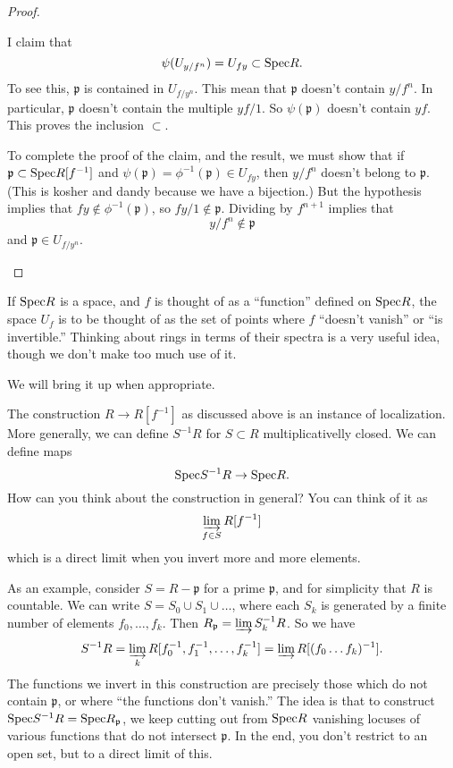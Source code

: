 \begin{proof}
\begin{enumerate}
I claim that
\[ \psi(U_{y/f^n}) = U_{fy} \subset \mathrm{Spec} R.  \]
To see this, $\mathfrak{p}$ is contained in $U_{f/y^n}$. This mean that
$\mathfrak{p}$ doesn't contain $y/f^n$.  In particular, $\mathfrak{p}$ doesn't
contain  the multiple $yf/1$.  So $\psi(\mathfrak{p})$ doesn't contain $yf$.
This proves the inclusion $\subset$.  

To complete the proof of the claim, and
the result, we must show that if $\mathfrak{p} \subset \mathrm{Spec} R[f^{-1}]$ and
$\psi(\mathfrak{p}) = \phi^{-1}(\mathfrak{p}) \in U_{fy}$, then $y/f^n$ doesn't
belong to $\mathfrak{p}$.  (This is kosher and dandy because we have a bijection.) But the hypothesis implies that $fy \notin
\phi^{-1}(\mathfrak{p})$, so $fy/1 \notin \mathfrak{p}$.  Dividing by $f^{n+1}$
implies that
\[ y/f^{n} \notin \mathfrak{p}  \]
and $\mathfrak{p} \in U_{f/y^n}$. 
\end{enumerate}
\end{proof} 

If $\mathrm{Spec} R$ is a space, and $f$ is thought of as a ``function'' defined on
$\mathrm{Spec} R$, the space $U_f$ is to be thought of as the set of points where $f$
``doesn't vanish'' or ``is invertible.''
Thinking about rings in terms of their spectra is a very useful idea, though we
don't make too much use of it. 

We will bring it up when appropriate.  

\begin{remark} 
The construction $R \to R[f^{-1}]$ as discussed above is an instance of
localization.  More generally, we can define $S^{-1}R$ for $S \subset R$
multiplicativelly closed. We can define maps
\[ \mathrm{Spec} S^{-1}R \to \mathrm{Spec} R . \]
How can you think about the construction in general? You can think of it as
\[ \varinjlim_{f \in S} R[f^{-1}]  \]
which is a direct limit when you invert more and more elements.  

As an example, consider $S = R - \mathfrak{p}$ for a prime $\mathfrak{p}$, and for
simplicity that $R$ is countable. We can write $S =
S_0 \cup S_1 \cup \dots$, where each $S_k$ is generated by a finite number of
elements $f_0, \dots, f_k$.  Then $R_{\mathfrak{p}} = \varinjlim S_k^{-1} R$.
So we have
\[ S^{-1}R = \varinjlim_k R[f_0^{-1} , f_1^{-1}, \dots, f_k^{-1}  ] = \varinjlim
R[(f_0\dots f_k)^{-1}]. \]
The functions we invert in this construction are precisely those which do not
contain $\mathfrak{p}$, or where ``the functions don't vanish.''  The idea is
that to construct $\mathrm{Spec} S^{-1}R = \mathrm{Spec} R_{\mathfrak{p}}$, we keep cutting out
from $\mathrm{Spec} R$ vanishing locuses of various functions that do not
intersect $\mathfrak{p}$.  In the end, you don't restrict to an open set, but
to a direct limit of this.
\end{remark} 

